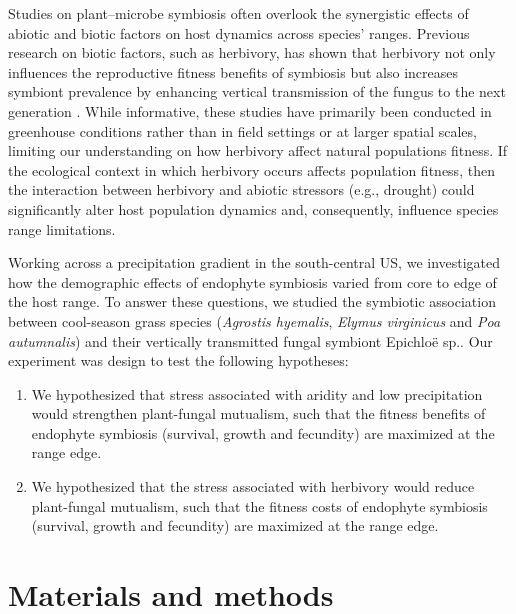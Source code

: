 \documentclass[12pt]{article}\usepackage[]{graphicx}\usepackage[dvipsnames]{xcolor}
\begin{document}
Studies on plant–microbe symbiosis often overlook the synergistic effects of abiotic and biotic factors on host dynamics across species' ranges.
Previous research on biotic factors, such as herbivory, has shown that herbivory not only influences the reproductive fitness benefits of symbiosis but also increases symbiont prevalence by enhancing vertical transmission of the fungus to the next generation \citep{gundel2020simulated,agrawal1999transgenerational}.
While informative, these studies have primarily been conducted in greenhouse conditions rather than in field settings or at larger spatial scales, limiting our understanding on how herbivory affect natural populations fitness.
If the ecological context in which herbivory occurs affects population fitness, then the interaction between herbivory and abiotic stressors (e.g., drought) could significantly alter host population dynamics and, consequently, influence species range limitations.

Working across a precipitation gradient in the south-central US, we investigated  how the demographic effects of endophyte symbiosis varied from core to edge of the host range.
To answer these questions, we studied the symbiotic association between  cool-season grass species (\emph{Agrostis hyemalis}, \emph{Elymus virginicus} and \emph{Poa autumnalis}) and their  vertically transmitted fungal symbiont Epichloë sp.. 
Our experiment was design to test the following hypotheses:
\begin{enumerate}
\item We hypothesized that stress associated with aridity and low precipitation would strengthen plant-fungal mutualism, such that the fitness benefits of endophyte symbiosis (survival, growth and fecundity) are maximized at the range edge. 
\item We hypothesized that the stress associated with herbivory would reduce plant-fungal mutualism, such that the fitness costs of endophyte symbiosis (survival, growth and fecundity) are maximized at the range edge. 
\end{enumerate}

\section*{Materials and methods}
\end{document}

